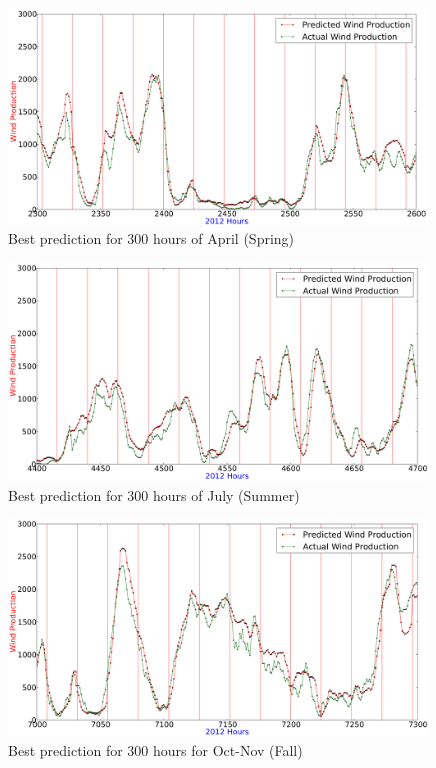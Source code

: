 \begin{figure}[H]
\centering
\includegraphics[width=0.99\textwidth]{billeder/bestPossiblePredictionWindProduction2300-2600_April_Spring.png}
\caption{Best prediction for 300 hours of April (Spring)}
\label{fig:bestWPPredictSpring}
\end{figure}

\begin{figure}[H]
\centering
\includegraphics[width=0.99\textwidth]{billeder/bestPossiblePredictionWindProduction4400-4700-Summer.png}
\caption{Best prediction for 300 hours of July (Summer)}
\label{fig:bestPredictWPSummer}
\end{figure}

\begin{figure}[H]
\centering
\includegraphics[width=0.99\textwidth]{billeder/bestPossiblePredictionWindProduction7000-7300_Fall.png}
\caption{Best prediction for 300 hours for Oct-Nov (Fall)}
\label{fig:bestPredictWPFall}
\end{figure}

